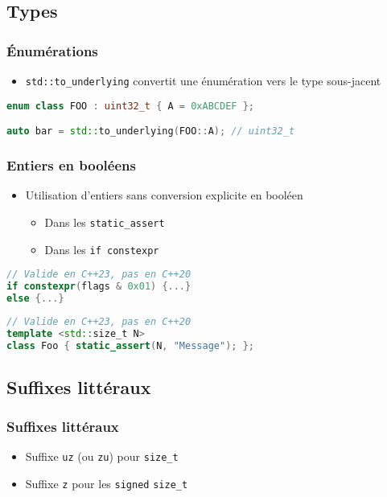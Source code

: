 \documentclass[C++.tex]{subfiles}
\begin{document}
\subsection*{Types}
\begin{frame}[fragile]
	\frametitle{Énumérations}
	\begin{itemize}
		\item \lstinline|std::to_underlying| convertit une énumération vers le type sous-jacent

	\end{itemize}

	\begin{lstlisting}[language=C++]
enum class FOO : uint32_t { A = 0xABCDEF };

auto bar = std::to_underlying(FOO::A); // uint32_t\end{lstlisting}
\end{frame}

\begin{frame}[fragile]
	\frametitle{Entiers en booléens}
	\begin{itemize}
		\item Utilisation d'entiers sans conversion explicite en booléen
		\begin{itemize}
			\item Dans les \lstinline|static_assert|
			\item Dans les \lstinline|if constexpr|
		\end{itemize}
	\end{itemize}

	\begin{lstlisting}[language=C++]
// Valide en C++23, pas en C++20
if constexpr(flags & 0x01) {...}
else {...}\end{lstlisting}

	\begin{lstlisting}[language=C++]
// Valide en C++23, pas en C++20
template <std::size_t N>
class Foo {	static_assert(N, "Message"); };\end{lstlisting}
\end{frame}

\subsection*{Suffixes littéraux}
\begin{frame}[fragile]
	\frametitle{Suffixes littéraux}
	\begin{itemize}
		\item Suffixe \lstinline|uz| (ou \lstinline|zu|) pour \lstinline|size_t|
		\item Suffixe \lstinline|z| pour les \og \lstinline|signed|\fg{} \lstinline|size_t|

	\end{itemize}
\end{frame}
\end{document}
